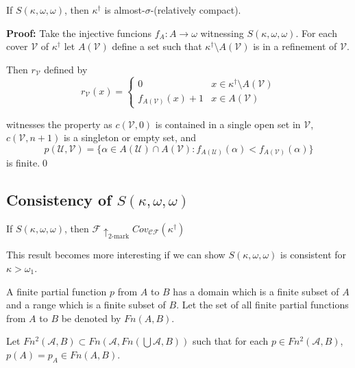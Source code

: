 \documentclass{beamer}
\theoremstyle{theorem}
\theoremstyle{definition}
\newcommand{\kmarkwin}[1]{\uparrow_{#1\text{-mark}}}
\newcommand{\oneptlind}[1]{#1^\dagger}
\newcommand{\mengame}[1]{Cov_{\pl C\pl F}(#1)}
\newcommand{\<}{\langle}
\renewcommand{\>}{\rangle}
\newcommand{\mc}[1]{\mathcal{#1}}
\newcommand{\scish}{almost-$\sigma$-(relatively compact)}
\newcommand{\pl}[1]{\mathscr{#1}}
\begin{document}
\begin{frame}

  \begin{theorem}
    If $S(\kappa,\omega,\omega)$, then $\oneptlind{\kappa}$ is \scish.
  \end{theorem}\pause

  \textbf{Proof:}
    Take the injective funcions $f_A:A\to\omega$ witnessing $S(\kappa,\omega,\omega)$. For each cover $\mc V$ of $\oneptlind{\kappa}$ let $A(\mc V)$ define a set such that $\oneptlind{\kappa}\setminus A(\mc V)$ is in a refinement of $\mc V$. \pause

    Then $r_{\mc V}$ defined by 
      \[
        r_{\mc V}(x) = \left\{
      \begin{array}{ll}
        0 & x\in\oneptlind{\kappa}\setminus A(\mc V) \\
        f_{A(\mc V)}(x)+1 & x\in A(\mc V)
      \end{array}
      \right.
      \] 

    witnesses the property as $c(\mc V,0)$ is contained in a single open set in $\mc V$, $c(\mc V,n+1)$ is a singleton or empty set, and
      \[
        p(\mc U,\mc V) = \{\alpha\in A(\mc U)\cap A(\mc V) : f_{A(\mc U)}(\alpha)<f_{A(\mc V)}(\alpha)\}
      \]
    is finite.\qed
\end{frame}

\subsection{Consistency of $S(\kappa,\omega,\omega)$}

\begin{frame}
  \begin{corollary}
    If $S(\kappa,\omega,\omega)$, then $\pl F\kmarkwin{2}\mengame{\oneptlind{\kappa}}$
  \end{corollary}
  This result becomes more interesting if we can show $S(\kappa,\omega,\omega)$ is consistent for $\kappa>\omega_1$.\pause

  \begin{definition}
    A finite partial function $p$ from $A$ to $B$ has a domain which is a finite subset of $A$ and a range which is a finite subset of $B$. Let the set of all finite partial functions from $A$ to $B$ be denoted by $Fn(A,B)$.
  \end{definition}\pause
  \begin{definition}
    Let $Fn^2(\mc A,B)\subset Fn(\mc A,Fn(\bigcup \mc A,B))$ such that for each $p\in Fn^2(\mc A,B)$, $p(A)=p_A\in Fn(A,B)$.
  \end{definition}
\end{frame}
\end{document}
